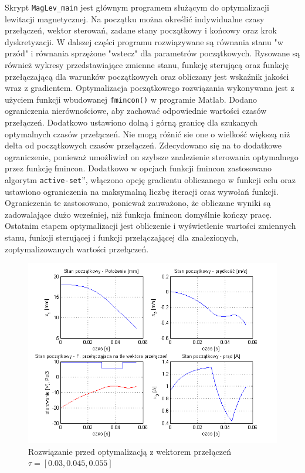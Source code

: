 Skrypt \texttt{MagLev\_main} jest głównym programem służącym do optymalizacji lewitacji magnetycznej. Na początku
można określić indywidualne czasy przełączeń, wektor sterowań, zadane stany początkowy i końcowy oraz
krok dyskretyzacji. W dalszej części programu rozwiązywane są równania stanu "w przód" i równania
sprzężone "wstecz" dla parametrów początkowych. Rysowane są również wykresy przedstawiające zmienne stanu, 
funkcję sterującą oraz funkcję przełączającą dla warunków początkowych oraz obliczany jest wskaźnik jakości
wraz z gradientem. Optymalizacja początkowego rozwiązania wykonywana jest z użyciem funkcji wbudowanej 
\texttt{fmincon()} w programie Matlab. Dodano ograniczenia nierównościowe, aby zachować odpowiednie wartości czasów
przełączeń. Dodatkowo ustawiono dolną i górną granicę dla szukanych optymalnych czasów przełączeń. Nie 
mogą różnić sie one o wielkość większą niż delta od początkowych czasów przełączeń. Zdecydowano się na to
dodatkowe ograniczenie, ponieważ umożliwiał on szybsze znalezienie sterowania optymalnego przez funkcję
fmincon. Dodatkowo w opcjach funkcji fmincon zastosowano algorytm \quotedblbase \texttt{active-set}\textquotedblright, włączono opcję gradientu
obliczanego w funkcji celu oraz ustawiono ograniczenia na maksymalną liczbę iteracji oraz wywołań funkcji.
Ograniczenia te zastosowano, ponieważ zauważono, że obliczane wyniki są zadowalające dużo wcześniej, niż
funkcja fmincon domyślnie kończy pracę. Ostatnim etapem optymalizacji jest obliczenie i wyświetlenie 
wartości zmiennych stanu, funkcji sterującej i funkcji przełączającej dla znalezionych, zoptymalizowanych
wartości przełączeń. 

\begin{figure}[!htb]
\centering
\includegraphics[scale=1]{img/start3.png}
\caption{Rozwiązanie przed optymalizacją z wektorem przełączeń $\tau = [0.03, 0.045, 0.055]$}
\label{rys:start1}
\end{figure}



